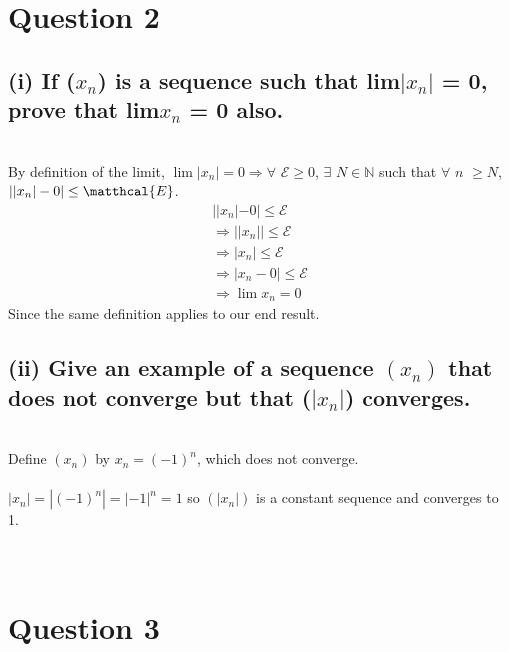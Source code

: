 \documentclass{article}
\begin{document}
\section*{Question 2}
\subsection*{(i) If (\(x_n\)) is a sequence such that lim\(|x_n|\) = 0, prove that lim\(x_n\) = 0 also.}

\solution
\\
By definition of the limit, \(\lim|x_n| = 0 \Rightarrow \forall\) \(\mathcal{E} \geq 0\), \(\exists\) \(N \in \mathds{N}\) such that \(\forall\) \(n\) \(\geq N\), \(||x_n| - 0| \leq \matthcal{E}\).
\begin{align}
  \label{}
  ||x_n| - 0| \leq \mathcal{E} \nonumber \\
  \Rightarrow ||x_n|| \leq \mathcal{E} \nonumber \\
  \Rightarrow |x_n| \leq \mathcal{E} \nonumber \\
  \Rightarrow |x_n - 0| \leq \mathcal{E} \nonumber \\
  \Rightarrow \lim x_n = 0 \nonumber
\end{align}
Since the same definition applies to our end result.

\subsection*{(ii) Give an example of a sequence \((x_n)\) that does not converge but that (\(|x_n|\)) converges.}
\solution
\\
Define \((x_n)\) by \(x_n = (-1)^n\), which does not converge.
\\
\\
\(|x_n| = |(-1)^n| = |-1|^n = 1\) so \((|x_n|)\) is a constant sequence and converges to 1.
\\\\\\
\section*{Question 3}
\end{document}
